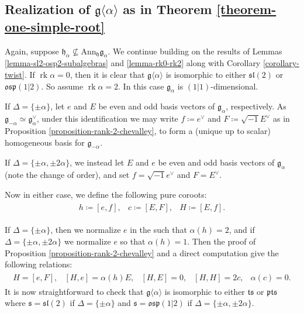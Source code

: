 \documentclass[12pt, a4paper, reqno]{amsart}
\def\p{\mathfrak{p}}
\def\g{\mathfrak{g}}
\def\l{\mathfrak{l}}
\def\s{\mathfrak{s}}
\def\o{\mathfrak{o}}
\def\rk{\operatorname{rk}}
\theoremstyle{definition}
\theoremstyle{definition}
\theoremstyle{definition}
\numberwithin{theorem}{section}
\numberwithin{lemma}{section}
\numberwithin{remark}{section}
\numberwithin{definition}{section}
\numberwithin{corollary}{section}
\numberwithin{proposition}{section}
\numberwithin{example}{section}
\begin{document}
	\subsection{Realization of  \(\mathfrak{g}\langle \alpha \rangle\) as in Theorem \ref{theorem-one-simple-root}}\label{section-realization}
	Again, suppose \(\mathfrak{h}_{\alpha} \nsubseteq \mathrm{Ann}_{\mathfrak{h}}\mathfrak{g}_{\alpha}\). We continue building on the results of Lemmas \ref{lemma-sl2-osp2-subalgebras} and \ref{lemma-rk0-rk2} along with Corollary \ref{corollary-twist}. If \(\rk\alpha =0\), then it is clear that \(\mathfrak{g}\langle \alpha \rangle\) is isomorphic to either \(\s\l(2)\) or \(\mathfrak{osp}(1|2)\). So assume \(\rk\alpha = 2\). In this case $\g_{\alpha}$ is $(1|1)$-dimensional.
	
	If $\Delta=\{\pm\alpha\}$, let \(e\) and \(E\) be even and odd basis vectors of $\g_{\alpha}$, respectively.  As \(\mathfrak{g}_{-\alpha} \simeq \mathfrak{g}_{\alpha}^\vee\), under this identification we may write \(f \coloneq e^\vee\) and \(F \coloneq \sqrt{-1}E^\vee\) as in Proposition \ref{proposition-rank-2-chevalley}, to form a (unique up to scalar) homogeneous basis for \(\mathfrak{g}_{-\alpha}\).
	
	If $\Delta=\{\pm\alpha,\pm2\alpha\}$, we instead let \(E\) and \(e\) be even and odd basis vectors of $\g_{\alpha}$ (note the change of order), and set $f=\sqrt{-1}e^{\vee}$ and $F=E^\vee$.
	
	Now in either case, we define the following pure coroots:
	\begin{align*}
		\begin{array}{ccc}
			h \coloneq [e,f], & c \coloneq [E,F], & H \coloneq [E,f].
		\end{array}
	\end{align*}
	
	If $\Delta=\{\pm\alpha\}$, then we normalize \(e\) in the  such that \(\alpha(h) = 2\), and if $\Delta=\{\pm\alpha,\pm2\alpha\}$ we normalize $e$ so that $\alpha(h)=1$.  Then the proof of Proposition \ref{proposition-rank-2-chevalley} and a direct computation give the following relations:
	\begin{align*}
		\begin{array}{ccccc}
			H = [e,F], & [H,e] =\alpha(h)E, & [H,E] = 0, & [H,H] = 2c,  & \alpha(c)=0.
		\end{array}
	\end{align*}
	It is now straightforward to check that $\g\langle\alpha\rangle$ is isomorphic to either $\mathfrak{t}\s$ or $\mathfrak{pt}\s$ where $\s=\s\l(2)$ if $\Delta=\{\pm\alpha\}$ and $\s=\o\s\p(1|2)$ if $\Delta=\{\pm\alpha,\pm2\alpha\}$.
	
\end{document}
